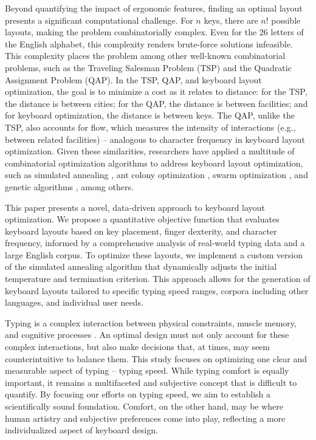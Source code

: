 Beyond quantifying the impact of ergonomic features, finding an optimal layout presents a significant computational challenge. For $n$ keys, there are $n!$ possible layouts, making the problem combinatorially complex. Even for the 26 letters of the English alphabet, this complexity renders brute-force solutions infeasible. This complexity places the problem among other well-known combinatorial problems, such as the Traveling Salesman Problem (TSP) and the Quadratic Assignment Problem (QAP). In the TSP, QAP, and keyboard layout optimization, the goal is to minimize a cost as it relates to distance: for the TSP, the distance is between cities; for the QAP, the distance is between facilities; and for keyboard optimization, the distance is between keys. The QAP, unlike the TSP, also accounts for flow, which measures the intensity of interactions (e.g., between related facilities)  -- analogous to character frequency in keyboard layout optimization. Given these similarities, researchers have applied a multitude of combinatorial optimization algorithms to address keyboard layout optimization, such as simulated annealing \citep{light1993typewriter}, ant colony optimization \citep{eggers2003optimization}, swarm optimization \citep{yin2011cyber}, and genetic algorithms \citep{liebrock2005proceedings}, among others.

This paper presents a novel, data-driven approach to keyboard layout optimization. We propose a quantitative objective function that evaluates keyboard layouts based on key placement, finger dexterity, and character frequency, informed by a comprehensive analysis of real-world typing data and a large English corpus. To optimize these layouts, we implement a custom version of the simulated annealing algorithm that dynamically adjusts the initial temperature and termination criterion. This approach allows for the generation of keyboard layouts tailored to specific typing speed ranges, corpora including other languages, and individual user needs.

Typing is a complex interaction between physical constraints, muscle memory, and cognitive processes \citep{hiraga}. An optimal design must not only account for these complex interactions, but also make decisions that, at times, may seem counterintuitive to balance them. This study focuses on optimizing one clear and measurable aspect of typing -- typing speed. While typing comfort is equally important, it remains a multifaceted and subjective concept that is difficult to quantify. By focusing our efforts on typing speed, we aim to establish a scientifically sound foundation. Comfort, on the other hand, may be where human artistry and subjective preferences come into play, reflecting a more individualized aspect of keyboard design. %

